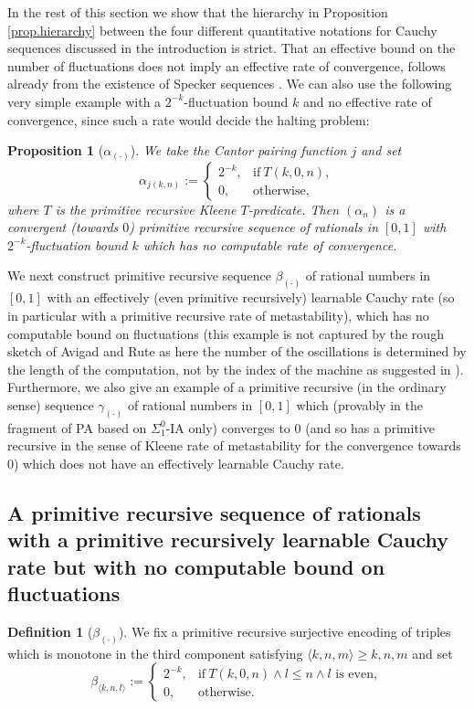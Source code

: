 \documentclass[1p]{elsarticle}
\newcommand{\Tif}{\text{if}\ }
\newcommand{\Telse}{\text{otherwise}}
\theoremstyle{plain}
\newtheorem{prop}[thm]{Proposition}
\theoremstyle{definition}
\newtheorem{dfn}[thm]{Definition}
\theoremstyle{remark}
\theoremstyle{definition}
\begin{document}
{In the rest of this section we show that the hierarchy in Proposition \ref{prop.hierarchy} 
between the four different 
quantitative notations for Cauchy sequences discussed in the introduction 
is strict. That an effective bound on the number of fluctuations does not imply an 
effective rate of convergence, follows already from the existence of Specker 
sequences \cite{Specker(49)}. We can also use the following
very simple example with a $2^{-k}$-fluctuation bound $k$ and no effective rate of convergence, since such a rate would decide the halting problem:\\ 
\begin{prop}[$\alpha_{(\cdot)}$] 
We take the Cantor pairing function $j$ and set
\[
\alpha_{j(k,n)}:=
\begin{cases}
2^{-k}, &\Tif T(k,0,n),\\
0, &\Telse,
\end{cases}
\]
where $T$ is the primitive recursive Kleene $T$-predicate. Then $(\alpha_n)$ 
is a convergent (towards $0$)
primitive recursive sequence of rationals in $[0,1]$ with $2^{-k}$-fluctuation 
bound $k$ which has no computable 
rate of convergence.
\end{prop}
We next construct primitive recursive sequence $\beta_{(\cdot)}$ of rational 
numbers in $[0,1]$ with an effectively (even primitive recursively) learnable Cauchy rate (so in particular with a primitive recursive rate of metastability), which has no computable bound on fluctuations (this example is not captured by the rough sketch of Avigad and Rute as here the number of the oscillations is determined by the length of the computation, not by the index of the machine as suggested in \cite{Avigad/Rute}). 
Furthermore, we also give an example of a primitive recursive (in the ordinary 
sense) sequence $\gamma_{(\cdot)}$ of rational numbers in $[0,1]$ 
which (provably in the fragment 
of PA based on $\Sigma^0_1$-IA only) converges to $0$ (and so 
has a primitive recursive in the sense of Kleene rate of metastability 
for the convergence towards $0$) 
which does not have an effectively learnable Cauchy rate. 

\subsection{A primitive recursive sequence of rationals 
with a primitive recursively learnable Cauchy rate but with no computable 
bound on fluctuations}

\begin{dfn}[$\beta_{(\cdot)}$]\label{d:beta}
We fix a primitive recursive 
surjective encoding of triples which is monotone in the third component 
satisfying $\langle k,n,m\rangle\ge k,n,m$ and set
\[
\beta_{\langle k,n,l\rangle}:=
\begin{cases}
2^{-k}, &\Tif T(k,0,n) \wedge l\leq n \wedge l\text{ is even},\\
0, &\Telse.
\end{cases}
\]
\end{dfn}

}
\end{document}
